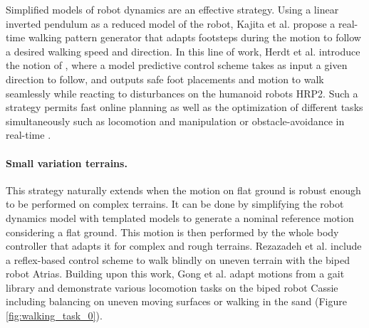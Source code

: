 Simplified models of robot dynamics are an effective strategy.
Using a linear inverted pendulum as a reduced model of the robot, Kajita et al. \cite{kajita2002LIP2} propose a real-time walking pattern generator that adapts footsteps during the motion to follow a desired walking speed and direction.
In this line of work, Herdt et al. \cite{herd_2010, herd_perrin_2010} introduce the notion of , where a model predictive control scheme takes as input a given direction to follow, and outputs safe foot placements and motion to walk seamlessly while reacting to disturbances on the humanoid robots HRP2.
Such a strategy permits fast online planning \cite{hurst_2018} as well as the optimization of different tasks simultaneously such as locomotion and manipulation \cite{florent2012} or obstacle-avoidance in real-time \cite{naveau2017}.


\paragraph{Small variation terrains.\label{par:whole-body:uneven}}
This strategy naturally extends when the motion on flat ground is robust enough to be performed on complex terrains.
It can be done by simplifying the robot dynamics model with templated models to generate a nominal reference motion considering a flat ground.
This motion is then performed by the whole body controller that adapts it for complex and rough terrains.
Rezazadeh et al. \cite{rezazadeh_hurst_atrias_2020} include a reflex-based control scheme to walk blindly on uneven terrain with the biped robot Atrias.
Building upon this work, Gong et al. \cite{Cassie_feedback_control_2018} adapt motions from a gait library and demonstrate various locomotion tasks on the biped robot Cassie including   balancing on uneven moving surfaces or walking in the sand (Figure \ref{fig:walking_task_0}).

